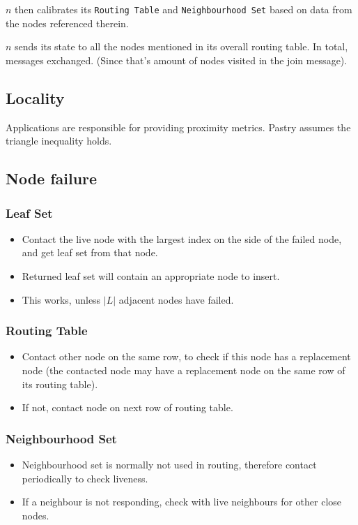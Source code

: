 	$n$ then calibrates its \texttt{Routing Table} and \texttt{Neighbourhood Set} based on data from the nodes referenced therein. 
	
	$n$ sends its state to all the nodes mentioned in its overall routing table. In total,  messages exchanged. (Since that's amount of nodes visited in the join message).
	
	\subsection{Locality}
	Applications are responsible for providing proximity metrics. Pastry assumes the triangle inequality holds.
	
	\subsection{Node failure}
	\subsubsection{Leaf Set}
	\begin{itemize}
		\item Contact the live node with the largest index on the side of the failed node, and get leaf set from that node.
		\item Returned leaf set will contain an appropriate node to insert.
		\item This works, unless $\lvert L \rvert$ adjacent nodes have failed.
	\end{itemize}
	
	\subsubsection{Routing Table}
	\begin{itemize}
		\item Contact other node on the same row, to check if this node has a replacement node (the contacted node may have a replacement node on the same row of its routing table).
		\item If not, contact node on next row of routing table.
	\end{itemize}
	
	\subsubsection{Neighbourhood Set}
	\begin{itemize}
		\item Neighbourhood set is normally not used in routing, therefore contact periodically to check liveness.
		\item If a neighbour is not responding, check with live neighbours for other close nodes.
	\end{itemize}
	
